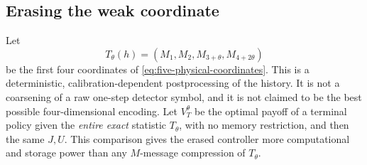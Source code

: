 \documentclass[11pt]{amsart}
\theoremstyle{definition}\newtheorem{definition}[theorem]{Definition}
\theoremstyle{remark}\newtheorem{remark}[theorem]{Remark}
\begin{document}
\subsection{Erasing the weak coordinate}
Let
\begin{equation}\label{eq:jet-erasure}
 T_\theta(h)=(M_1,M_2,M_{3+\theta},M_{4+2\theta})
\end{equation}
be the first four coordinates of \eqref{eq:five-physical-coordinates}.
This is a deterministic, calibration-dependent postprocessing of the
history. It is not a coarsening of a raw one-step detector symbol, and it
is not claimed to be the best possible four-dimensional encoding.
Let $V_T^\theta$ be the optimal payoff of a terminal policy given the
\emph{entire exact} statistic $T_\theta$, with no memory restriction,
and then the same $J,U$. This comparison gives the erased controller
more computational and storage power than any $M$-message compression
of $T_\theta$.
\end{document}
